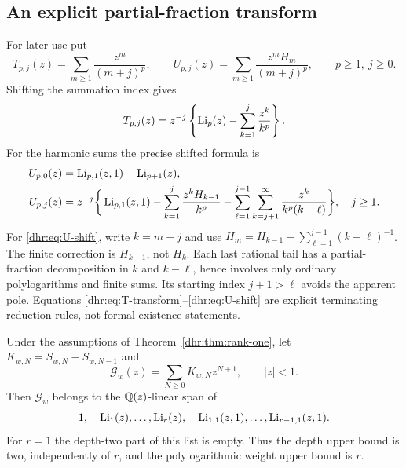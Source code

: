 \subsection{An explicit partial-fraction transform}
For later use put
\[
 T_{p,j}(z)=\sum_{m\geq1}\frac{z^m}{(m+j)^p},\qquad
 U_{p,j}(z)=\sum_{m\geq1}\frac{z^mH_m}{(m+j)^p},
 \qquad p\geq1,\ j\geq0.
\]
Shifting the summation index gives
\begin{equation}\label{dhr:eq:T-transform}
 T_{p,j}(z)=z^{-j}\left\{\operatorname{Li}_p(z)-
                    \sum_{k=1}^j\frac{z^k}{k^p}\right\}.
\end{equation}
For the harmonic sums the precise shifted formula is
\begin{align}
 U_{p,0}(z)&=\operatorname{Li}_{p,1}(z,1)+\operatorname{Li}_{p+1}(z),
 \label{dhr:eq:U-zero}\\
 U_{p,j}(z)&=z^{-j}\bigg\{\operatorname{Li}_{p,1}(z,1)
 -\sum_{k=1}^j\frac{z^kH_{k-1}}{k^p}
 -\sum_{\ell=1}^{j-1}\sum_{k=j+1}^{\infty}
             \frac{z^k}{k^p(k-\ell)}\bigg\},\quad j\geq1.
 \label{dhr:eq:U-shift}
\end{align}
For \eqref{dhr:eq:U-shift}, write $k=m+j$ and use
$H_m=H_{k-1}-\sum_{\ell=1}^{j-1}(k-\ell)^{-1}$.
The finite correction is $H_{k-1}$, not $H_k$.
Each last rational tail has a partial-fraction decomposition in
$k$ and $k-\ell$, hence involves only ordinary polylogarithms and
finite sums. Its starting index $j+1>\ell$ avoids the apparent pole.
Equations \eqref{dhr:eq:T-transform}--\eqref{dhr:eq:U-shift} are
explicit terminating reduction rules, not formal existence statements.

\begin{theorem}\label{dhr:thm:closure}
Under the assumptions of Theorem~\ref{dhr:thm:rank-one}, let
$K_{w,N}=S_{w,N}-S_{w,N-1}$ and
\begin{equation}\label{dhr:eq:general-generating}
 \mathcal G_w(z)=\sum_{N\geq0}K_{w,N}z^{N+1},\qquad |z|<1.
\end{equation}
Then $\mathcal G_w$ belongs to the $\mathbb Q(z)$-linear span of
\begin{equation}\label{dhr:eq:closure-space}
 1,\quad \operatorname{Li}_1(z),\ldots,\operatorname{Li}_r(z),\quad
 \operatorname{Li}_{1,1}(z,1),\ldots,\operatorname{Li}_{r-1,1}(z,1).
\end{equation}
For $r=1$ the depth-two part of this list is empty. Thus the depth
upper bound is two, independently of $r$, and the polylogarithmic
weight upper bound is $r$.
\end{theorem}

